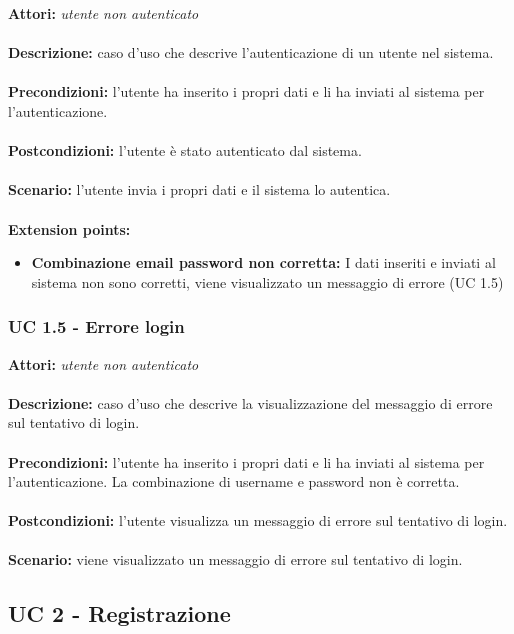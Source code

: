 \documentclass[a4paper,11pt]{article}
\begin{document}
\textbf{Attori:} \textit{utente non autenticato}
\\ \\
\textbf{Descrizione:} caso d'uso che descrive l'autenticazione di un utente nel sistema.\\
\\
\textbf{Precondizioni:} l'utente ha inserito i propri dati e li ha inviati al sistema per l'autenticazione.\\
\\
\textbf{Postcondizioni:} l’utente è stato autenticato dal sistema.\\
\\
\textbf{Scenario:} l’utente invia i propri dati e il sistema lo autentica.\\
\\
\textbf{Extension points:} 
\begin{itemize}
	\item \textbf{Combinazione email password non corretta:} I dati inseriti e inviati al sistema non sono corretti, viene visualizzato un messaggio di errore (UC 1.5)
\end{itemize}


\subsubsection{UC 1.5 - Errore login}

\textbf{Attori:} \textit{utente non autenticato}
\\ \\
\textbf{Descrizione:} caso d'uso che descrive la visualizzazione del messaggio di errore sul tentativo di login.\\
\\
\textbf{Precondizioni:} l'utente ha inserito i propri dati e li ha inviati al sistema per l'autenticazione. La combinazione di username e password non è corretta.\\
\\
\textbf{Postcondizioni:} l’utente visualizza un messaggio di errore sul tentativo di login.\\
\\
\textbf{Scenario:} viene visualizzato un messaggio di errore sul tentativo di login.\\


\subsection{UC 2 - Registrazione}
\end{document}
